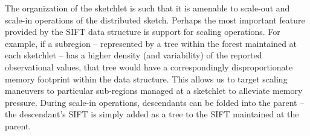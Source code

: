 The organization of the sketchlet is such that it is amenable to scale-out and scale-in operations of the distributed sketch. Perhaps the most important feature provided by the SIFT data structure is support for scaling operations. For example, if a subregion – represented by a tree within the forest maintained at each sketchlet – has a higher density (and variability) of the reported observational values, that tree would have a correspondingly disproportionate memory footprint within the data structure. This allows us to target scaling maneuvers to particular sub-regions managed at a sketchlet to alleviate memory pressure.  During scale-in operations, descendants can be folded into the parent – the descendant’s SIFT is simply added as a tree to the SIFT maintained at the parent.